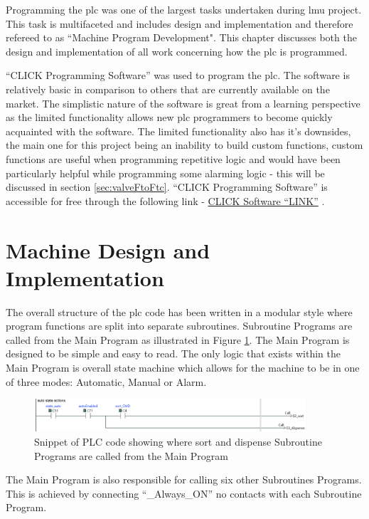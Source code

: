 Programming the \acrshort{plc} was one of the largest tasks undertaken during \acrshort{lmu} project. This task is multifaceted and includes design and implementation and therefore refereed to as ``Machine Program Development". This chapter discusses both the design and implementation of all work concerning how the \acrshort{plc} is programmed. 

``CLICK Programming Software'' was used to program the \acrshort{plc}. The software is relatively basic in comparison to others that are currently available on the market. The simplistic nature of the software is great from a learning perspective as the limited functionality allows new \acrshort{plc} programmers to become quickly acquainted with the software. The limited functionality also has it's downsides, the main one for this project being an inability to build custom functions, custom functions are useful when programming repetitive logic and would have been particularly helpful while programming some alarming logic - this will be discussed in section \ref{sec:valveFtoFtc}. ``CLICK Programming Software'' is accessible for free through the following link - \href{https://www.automationdirect.com/clickplcs/free-software/free-click-software}{CLICK Software ``LINK''} \cite{clickSoftwareDownload}.

\section{Machine Design and Implementation}
    The overall structure of the \acrshort{plc} code has been written in a modular style where program functions are split into separate subroutines. Subroutine Programs are called from the Main Program as illustrated in Figure \ref{fig:plcMainAuto}. The Main Program is designed to be simple and easy to read. The only logic that exists within the Main Program is overall state machine which allows for the machine to be in one of three modes: Automatic, Manual or Alarm. 

        \begin{figure}[H]
            \centering
            \includegraphics[width = 0.9\textwidth]{2_images/plcMainAuto}
            \caption{Snippet of PLC code showing where sort and dispense Subroutine Programs are called from the Main Program}
            \label{fig:plcMainAuto}
        \end{figure}
    The Main Program is also responsible for calling six other Subroutines Programs. This is achieved by connecting   ``\_Always\_ON'' \acrshort{no} contacts with each Subroutine Program.
    
